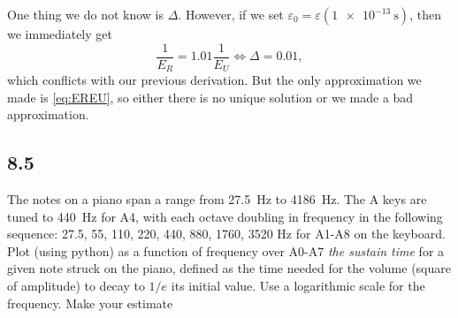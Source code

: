 \documentclass[12pt]{article}
\begin{document}
One thing we do not know is $\Delta$. However, if we set $\varepsilon_0 = \varepsilon(\SI{1e-13}{\second})$,
then we immediately get
\begin{equation}
  \frac{ 1 }{ E_R } = 1.01 \frac{ 1 }{ E_U } \Leftrightarrow \Delta = 0.01,
\end{equation}
which conflicts with our previous derivation.
But the only approximation we made is \eqref{eq:EREU}, so either there is no unique solution or we made
a bad approximation.

\subsection{8.5}
The notes on a piano span a range from \SI{27.5}{\hertz} to \SI{4186}{\hertz}.
The A keys are tuned to \SI{440}{\hertz} for A4, with each octave doubling in frequency
in the following sequence: 27.5, 55, 110, 220, 440, 880, 1760, 3520 Hz for A1-A8 on
the keyboard.  Plot (using python) as a function of frequency over A0-A7 \emph{the sustain time}
for a given note struck on the piano, defined as the time needed for the volume (square of amplitude)
to decay to $1/e$ its initial value.  Use a logarithmic scale for the frequency. Make your estimate
\end{document}
